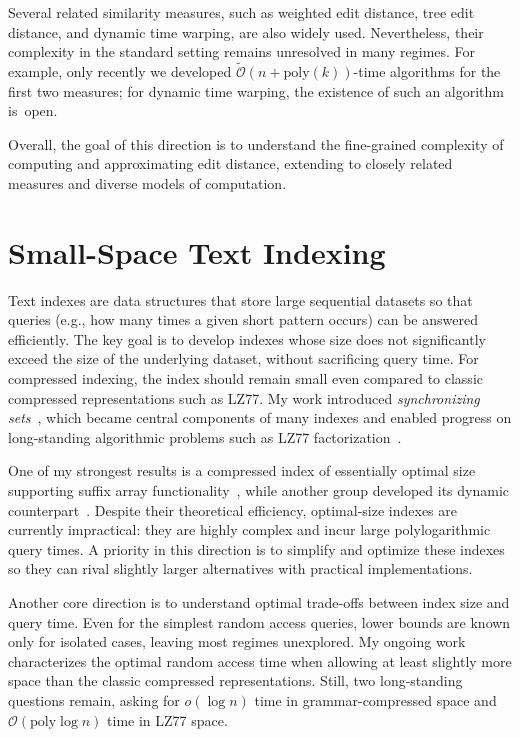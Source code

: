 \documentclass[a4paper,11pt]{article}
\newcommand{\Oh}{\mathcal{O}}
\newcommand{\Ohtilde}{\tilde{\mathcal{O}}}
\begin{document}
Several related similarity measures, such as weighted edit distance, tree edit distance, and dynamic time warping, are also widely used. 
Nevertheless, their complexity in the standard setting remains unresolved in many regimes. 
For example, only recently we developed $\Ohtilde(n+\mathrm{poly}(k))$-time algorithms for the first two measures; for dynamic time warping, the existence of such an algorithm is~open.  

Overall, the goal of this direction is to understand the fine-grained complexity of computing and approximating edit distance, extending to closely related measures and diverse models of computation.

\section{Small-Space Text Indexing}

Text indexes are data structures that store large sequential datasets so that queries (e.g., how many times a given short pattern occurs) can be answered efficiently. 
The key goal is to develop indexes whose size does not significantly exceed the size of the underlying dataset, without sacrificing query time. 
For compressed indexing, the index should remain small even compared to classic compressed representations such as LZ77.  
My work introduced \emph{synchronizing sets}~\cite{KK19}, which became central components of many indexes and enabled progress on long-standing algorithmic problems such as LZ77 factorization~\cite{KK24}.  

One of my strongest results is a compressed index of essentially optimal size supporting suffix array functionality~\cite{KK23}, while another group developed its dynamic counterpart~\cite{NT24}.  
Despite their theoretical efficiency, optimal-size indexes are currently impractical: they are highly complex and incur large polylogarithmic query times. 
A priority in this direction is to simplify and optimize these indexes so they can rival slightly larger alternatives with practical implementations.  

Another core direction is to understand optimal trade-offs between index size and query time. 
Even for the simplest random access queries, lower bounds are known only for isolated cases, leaving most regimes unexplored. 
My ongoing work characterizes the optimal random access time when allowing at least slightly more space than the classic compressed representations. Still, two long-standing questions remain, asking for $o(\log n)$ time in grammar-compressed space and $\Oh(\mathrm{poly}\log n)$ time in LZ77 space.  
\end{document}
